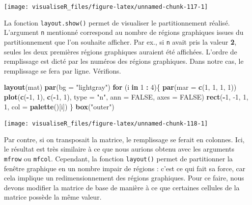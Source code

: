 \documentclass[]{article}
\newenvironment{Shaded}{\begin{snugshade}}{\end{snugshade}}
\newcommand{\ControlFlowTok}[1]{\textcolor[rgb]{0.13,0.29,0.53}{\textbf{#1}}}
\newcommand{\DataTypeTok}[1]{\textcolor[rgb]{0.13,0.29,0.53}{#1}}
\newcommand{\DecValTok}[1]{\textcolor[rgb]{0.00,0.00,0.81}{#1}}
\newcommand{\KeywordTok}[1]{\textcolor[rgb]{0.13,0.29,0.53}{\textbf{#1}}}
\newcommand{\NormalTok}[1]{#1}
\newcommand{\OperatorTok}[1]{\textcolor[rgb]{0.81,0.36,0.00}{\textbf{#1}}}
\newcommand{\OtherTok}[1]{\textcolor[rgb]{0.56,0.35,0.01}{#1}}
\newcommand{\StringTok}[1]{\textcolor[rgb]{0.31,0.60,0.02}{#1}}
\begin{document}
\begin{center}\texttt{[image: visualiseR\_files/figure-latex/unnamed-chunk-117-1]} \end{center}

La fonction \texttt{layout.show()} permet de visualiser le partitionnement réalisé.
L'argument \texttt{n} mentionné correspond au nombre de régions graphiques issues du
partitionnement que l'on souhaite afficher. Par ex., si \texttt{n} avait pris la valeur
\textbf{2}, seules les deux premières régions graphiques auraient été affichées.
L'ordre de remplissage est dicté par les numéros des régions graphiques. Dans
notre cas, le remplissage se fera par ligne. Vérifions.

\begin{Shaded}
\begin{Highlighting}[]
\KeywordTok{layout}\NormalTok{(mat)}
\KeywordTok{par}\NormalTok{(}\DataTypeTok{bg =} \StringTok{"lightgray"}\NormalTok{)}
\ControlFlowTok{for}\NormalTok{ (i }\ControlFlowTok{in} \DecValTok{1} \OperatorTok{:}\StringTok{ }\DecValTok{4}\NormalTok{)\{}
\KeywordTok{par}\NormalTok{(}\DataTypeTok{mar =} \KeywordTok{c}\NormalTok{(}\DecValTok{1}\NormalTok{, }\DecValTok{1}\NormalTok{, }\DecValTok{1}\NormalTok{, }\DecValTok{1}\NormalTok{))}
\KeywordTok{plot}\NormalTok{(}\KeywordTok{c}\NormalTok{(}\OperatorTok{-}\DecValTok{1}\NormalTok{, }\DecValTok{1}\NormalTok{), }\KeywordTok{c}\NormalTok{(}\OperatorTok{-}\DecValTok{1}\NormalTok{, }\DecValTok{1}\NormalTok{), }\DataTypeTok{type =} \StringTok{"n"}\NormalTok{, }\DataTypeTok{ann =} \OtherTok{FALSE}\NormalTok{, }\DataTypeTok{axes =} \OtherTok{FALSE}\NormalTok{)}
\KeywordTok{rect}\NormalTok{(}\OperatorTok{-}\DecValTok{1}\NormalTok{, }\DecValTok{-1}\NormalTok{, }\DecValTok{1}\NormalTok{, }\DecValTok{1}\NormalTok{, }\DataTypeTok{col =} \KeywordTok{palette}\NormalTok{()[i])}
\NormalTok{\}}
\KeywordTok{box}\NormalTok{(}\StringTok{"outer"}\NormalTok{)}
\end{Highlighting}
\end{Shaded}

\begin{center}\texttt{[image: visualiseR\_files/figure-latex/unnamed-chunk-118-1]} \end{center}

Par contre, si on transposait la matrice, le remplissage se ferait en colonnes.
Ici, le résultat est très similaire à ce que nous aurions obtenu avec les
arguments \texttt{mfrow} ou \texttt{mfcol}. Cependant, la fonction \texttt{layout()} permet de
partitionner la fenêtre graphique en un nombre impair de régions : c'est ce qui
fait sa force, car cela implique un redimensionnement des régions graphiques.
Pour ce faire, nous devons modifier la matrice de base de manière à ce que
certaines cellules de la matrice possède la même valeur.
\end{document}

